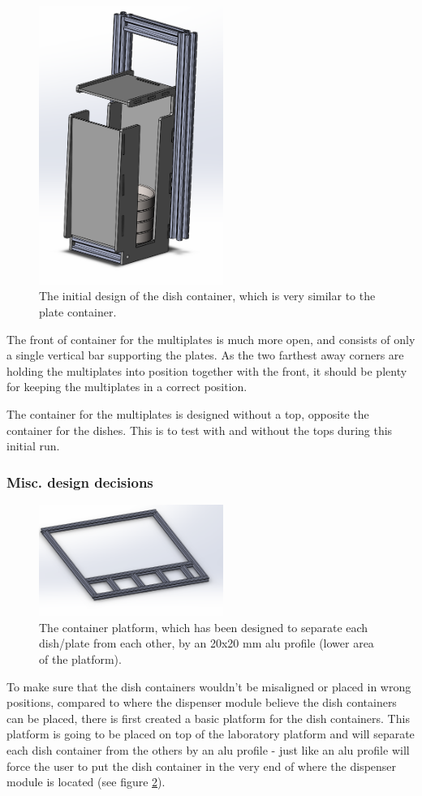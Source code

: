 \documentclass[10pt,a4paper]{article}
\begin{document}
	\begin{figure}
		\includegraphics[width=6cm]{images/initialContainer.png}
		\caption{The initial design of the dish container, which is very similar to the plate container.}
		\label{fig:initialContainer}
	\end{figure}
	
	The front of container for the multiplates is much more open, and consists of only a single vertical bar supporting the plates. As the two farthest away corners are holding the multiplates into position together with the front, it should be plenty for keeping the multiplates in a correct position.
	
	The container for the multiplates is designed without a top, opposite the container for the dishes. This is to test with and without the tops during this initial run.
		
	
	\subsubsection{Misc. design decisions}
	
	\begin{figure}
		\includegraphics[width=6cm]{images/containerPlatform.png}
		\caption{The container platform, which has been designed to separate each dish/plate from each other, by an 20x20 mm alu profile (lower area of the platform).}
		\label{fig:containerPlatform}
	\end{figure}
	To make sure that the dish containers wouldn't be misaligned or placed in wrong positions, compared to where the dispenser module believe the dish containers can be placed, there is first created a basic platform for the dish containers. This platform is going to be placed on top of the laboratory platform and will separate each dish container from the others by an alu profile - just like an alu profile will force the user to put the dish container in the very end of where the dispenser module is located (see figure \ref{fig:containerPlatform}).
	
\end{document}
